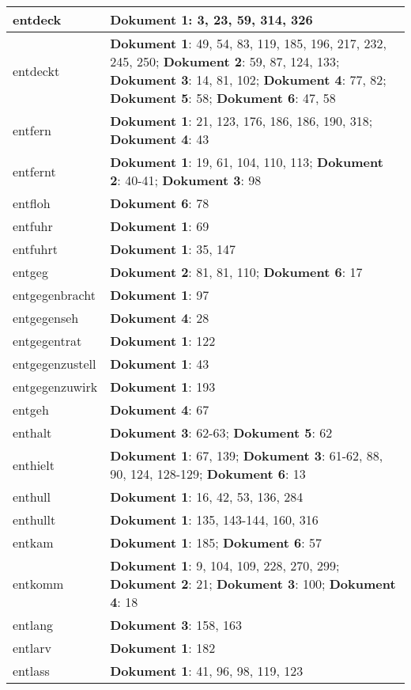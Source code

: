 \documentclass[a5paper]{article}
\begin{document}
\begin{longtable}[l]{|l|p{3in}|}
\hline
entdeck & \textbf{Dokument 1}: 3, 23, 59, 314, 326 \\
\hline
entdeckt & \textbf{Dokument 1}: 49, 54, 83, 119, 185, 196, 217, 232, 245, 250; \textbf{Dokument 2}: 59, 87, 124, 133; \textbf{Dokument 3}: 14, 81, 102; \textbf{Dokument 4}: 77, 82; \textbf{Dokument 5}: 58; \textbf{Dokument 6}: 47, 58 \\
\hline
entfern & \textbf{Dokument 1}: 21, 123, 176, 186, 186, 190, 318; \textbf{Dokument 4}: 43 \\
\hline
entfernt & \textbf{Dokument 1}: 19, 61, 104, 110, 113; \textbf{Dokument 2}: 40-41; \textbf{Dokument 3}: 98 \\
\hline
entfloh & \textbf{Dokument 6}: 78 \\
\hline
entfuhr & \textbf{Dokument 1}: 69 \\
\hline
entfuhrt & \textbf{Dokument 1}: 35, 147 \\
\hline
entgeg & \textbf{Dokument 2}: 81, 81, 110; \textbf{Dokument 6}: 17 \\
\hline
entgegenbracht & \textbf{Dokument 1}: 97 \\
\hline
entgegenseh & \textbf{Dokument 4}: 28 \\
\hline
entgegentrat & \textbf{Dokument 1}: 122 \\
\hline
entgegenzustell & \textbf{Dokument 1}: 43 \\
\hline
entgegenzuwirk & \textbf{Dokument 1}: 193 \\
\hline
entgeh & \textbf{Dokument 4}: 67 \\
\hline
enthalt & \textbf{Dokument 3}: 62-63; \textbf{Dokument 5}: 62 \\
\hline
enthielt & \textbf{Dokument 1}: 67, 139; \textbf{Dokument 3}: 61-62, 88, 90, 124, 128-129; \textbf{Dokument 6}: 13 \\
\hline
enthull & \textbf{Dokument 1}: 16, 42, 53, 136, 284 \\
\hline
enthullt & \textbf{Dokument 1}: 135, 143-144, 160, 316 \\
\hline
entkam & \textbf{Dokument 1}: 185; \textbf{Dokument 6}: 57 \\
\hline
entkomm & \textbf{Dokument 1}: 9, 104, 109, 228, 270, 299; \textbf{Dokument 2}: 21; \textbf{Dokument 3}: 100; \textbf{Dokument 4}: 18 \\
\hline
entlang & \textbf{Dokument 3}: 158, 163 \\
\hline
entlarv & \textbf{Dokument 1}: 182 \\
\hline
entlass & \textbf{Dokument 1}: 41, 96, 98, 119, 123 \\

\end{longtable}
\end{document}
